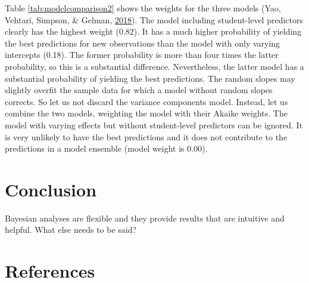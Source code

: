 \documentclass[
  english,
  doc]{apa6}
\begin{document}
Table \ref{tab:modelcomparison2} shows the weights for the three models (Yao, Vehtari, Simpson, \& Gelman, \protect\hyperlink{ref-YaoUsingStackingAverage2018}{2018}). The model including student-level predictors clearly has the highest weight (0.82). It has a much higher probability of yielding the best predictions for new observations than the model with only varying intercepts (0.18). The former probability is more than four times the latter probability, so this is a substantial difference. Nevertheless, the latter model has a substantial probability of yielding the best predictions. The random slopes may slightly overfit the sample data for which a model without random slopes corrects. So let us not discard the variance components model. Instead, let us combine the two models, weighting the model with their Akaike weights. The model with varying effects but without student-level predictors can be ignored. It is very unlikely to have the best predictions and it does not contribute to the predictions in a model ensemble (model weight is 0.00).

\hypertarget{conclusion}{%
\section{Conclusion}\label{conclusion}}

Bayesian analyses are flexible and they provide results that are intuitive and helpful. What else needs to be said?

\newpage

\hypertarget{references}{%
\section{References}\label{references}}

\begingroup
\setlength{\parindent}{-0.5in}
\setlength{\leftskip}{0.5in}
\end{document}
